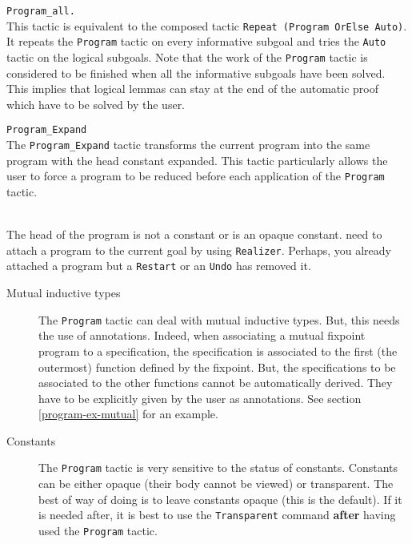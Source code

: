 \begin{Variants}
\item{\tt Program\_all.}
  \label{Program_all}\\
  This tactic is equivalent to the composed tactic
  \verb=Repeat (Program OrElse Auto)=. It repeats the \verb=Program=
  tactic on every informative subgoal and tries the \verb=Auto= tactic
  on the logical subgoals. Note that the work of the \verb=Program=
  tactic is considered to be finished when all the informative subgoals
  have been solved. This implies that logical lemmas can stay at the end
  of the automatic proof which have to be solved by the user.
\item {\tt Program\_Expand}
  \label{Program_Expand}\\
  The \verb=Program_Expand= tactic transforms the current program into
  the same program with the head constant expanded. This tactic
  particularly allows the user to force a program to be reduced before
  each application of the \verb=Program= tactic.

  \begin{ErrMsgs}
  \item {}\\
    The head of the program is not a constant or is an opaque constant.
    need to attach a program to the current goal by using {\tt Realizer}.
    Perhaps, you already attached a program but a {\tt Restart} or an
    {\tt Undo} has removed it.
  \end{ErrMsgs}
\end{Variants}


\begin{description}
\item[Mutual inductive types] The \verb=Program= tactic can deal with
  mutual inductive types. But, this needs the use of
  annotations. Indeed, when associating a mutual fixpoint program to a
  specification, the specification is associated to the first (the
  outermost) function defined by the fixpoint. But, the specifications
  to be associated to the other functions cannot be automatically
  derived. They have to be explicitly given by the user as
  annotations. See section \ref{program-ex-mutual} for an example.
  
\item[Constants] The \verb=Program= tactic is very sensitive to the
  status of constants. Constants can be either opaque (their body
  cannot be viewed) or transparent. The best of way of doing is to
  leave constants opaque (this is the default). If it is needed after,
  it is best to use the \verb=Transparent= command {\bf after} having
  used the \verb=Program= tactic.
\end{description}

